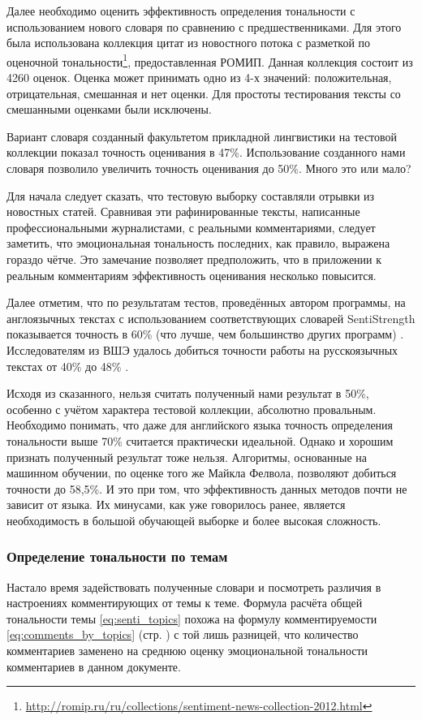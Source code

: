 Далее необходимо оценить эффективность определения тональности с использованием нового словаря по сравнению с предшественниками. Для этого была использована коллекция цитат из новостного потока с разметкой по оценочной тональности\footnote{\href{http://romip.ru/ru/collections/sentiment-news-collection-2012.html}{http://romip.ru/ru/collections/sentiment-news-collection-2012.html}}, предоставленная РОМИП. Данная коллекция состоит из 4260 оценок. Оценка может принимать одно из 4-х значений: положительная, отрицательная, смешанная и нет оценки. Для простоты тестирования тексты со смешанными оценками были исключены.

Вариант словаря созданный факультетом прикладной лингвистики на тестовой коллекции показал точность оценивания в 47\%. Использование созданного нами словаря позволило увеличить точность оценивания до 50\%. Много это или мало?

Для начала следует сказать, что тестовую выборку составляли отрывки из новостных статей. Сравнивая эти рафинированные тексты, написанные профессиональными журналистами, с реальными комментариями, следует заметить, что эмоциональная тональность последних, как правило, выражена гораздо чётче. Это замечание позволяет предположить, что в приложении к реальным комментариям эффективность оценивания несколько повысится.

Далее отметим, что по результатам тестов, проведённых автором программы, на англоязычных текстах с использованием соответствующих словарей SentiStrength показывается точность в 60\% (что лучше, чем большинство других программ) \cite{SentiStrength}. Исследователям из ВШЭ удалось добиться точности работы на русскоязычных текстах от 40\% до 48\% \cite[стр. 49]{kolcova_sentistrength}.

Исходя из сказанного, нельзя считать полученный нами результат в 50\%, особенно с учётом характера тестовой коллекции, абсолютно провальным. Необходимо понимать, что даже для английского языка точность определения тональности выше 70\% считается практически идеальной. Однако и хорошим признать полученный результат тоже нельзя. Алгоритмы, основанные на машинном обучении, по оценке того же Майкла Фелвола, позволяют добиться точности до 58,5\%. И это при том, что эффективность данных методов почти не зависит от языка. Их минусами, как уже говорилось ранее, является необходимость в большой обучающей выборке и более высокая сложность.

\subsubsection{Определение тональности по темам}
Настало время задействовать полученные словари и посмотреть различия в настроениях комментирующих от темы к теме. Формула расчёта общей тональности темы \ref{eq:senti_topics} похожа на формулу комментируемости \ref{eq:comments_by_topics} (стр. \pageref{eq:comments_by_topics}) с той лишь разницей, что количество комментариев заменено на среднюю оценку эмоциональной тональности комментариев в данном документе.

